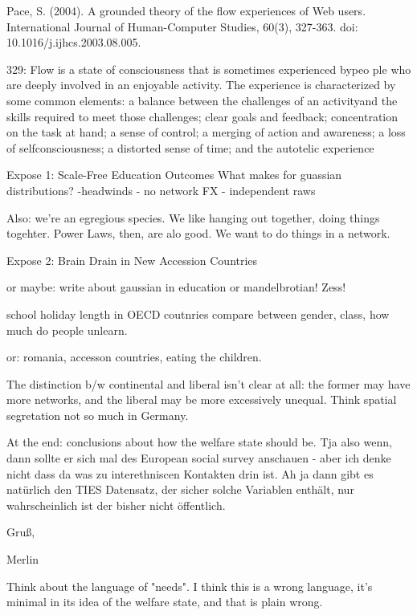 Pace, S. (2004). A grounded theory of the flow experiences of Web users. International Journal of Human-Computer Studies, 60(3), 327-363. doi: 10.1016/j.ijhcs.2003.08.005.

329: Flow is a state of consciousness that is sometimes experienced bypeo ple who are
deeply involved in an enjoyable activity. The experience is characterized by some
common elements: a balance between the challenges of an activityand the skills
required to meet those challenges; clear goals and feedback; concentration on the
task at hand; a sense of control; a merging of action and awareness; a loss of selfconsciousness;
a distorted sense of time; and the autotelic experience




Expose 1: Scale-Free Education Outcomes
What makes for guassian distributions?
-headwinds
- no network FX
- independent raws

Also: we're an egregious species. We like hanging out together, doing things togehter. Power Laws, then, are alo good. We want to do things in a network.


Expose 2: Brain Drain in New Accession Countries

or maybe: write about gaussian in education or mandelbrotian! Zess!

school holiday length in OECD coutnries compare between gender, class, how much do people unlearn.

or: romania, accesson countries, eating the children.


The distinction b/w continental and liberal isn't clear at all: the former may have more networks, and the liberal may be more excessively unequal.
Think spatial segretation not so much in Germany.

At the end: conclusions about how the welfare state should be.
Tja also wenn, dann sollte er sich mal des European social survey
anschauen -  aber ich denke nicht dass da was zu interethniscen
Kontakten drin ist.
Ah ja dann gibt es natürlich den TIES Datensatz, der sicher solche
Variablen enthält, nur wahrscheinlich ist der bisher nicht öffentlich.

Gruß,


Merlin


Think about the language of "needs". I think this is a wrong language, it's minimal in its idea of the welfare state, and that is plain wrong.



